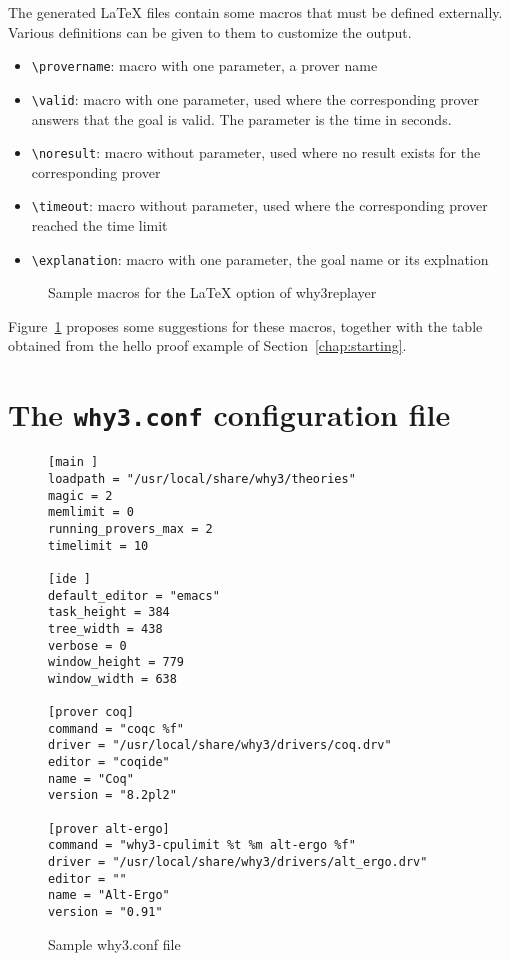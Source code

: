 The generated LaTeX files contain some macros that must be defined
externally.  Various definitions can be given to them to customize the
output. 
\begin{itemize}
\item \verb|\provername|: macro with one parameter, a prover name
\item \verb|\valid|: macro with one parameter, used where the corresponding prover answers that the goal is valid. The parameter is the time in seconds.
\item \verb|\noresult|: macro without parameter, used where no result
  exists for the corresponding prover
\item \verb|\timeout|: macro without parameter, used where the corresponding prover reached the time limit
\item \verb|\explanation|: macro with one parameter, the goal name or its explnation
\end{itemize}

\begin{figure}[t]
  \begin{center}
    
  \end{center}
  
  \caption{Sample macros for the LaTeX option of why3replayer}
\label{fig:replayer}
\end{figure}

Figure~\ref{fig:replayer} proposes some suggestions for these macros, together
with the table obtained from the hello proof example of Section~\ref{chap:starting}.




\section{The \texttt{why3.conf} configuration file}
\label{sec:whyconffile}


\begin{figure}[t]
\begin{verbatim}
[main ]
loadpath = "/usr/local/share/why3/theories"
magic = 2
memlimit = 0
running_provers_max = 2
timelimit = 10

[ide ]
default_editor = "emacs"
task_height = 384
tree_width = 438
verbose = 0
window_height = 779
window_width = 638

[prover coq]
command = "coqc %f"
driver = "/usr/local/share/why3/drivers/coq.drv"
editor = "coqide"
name = "Coq"
version = "8.2pl2"

[prover alt-ergo]
command = "why3-cpulimit %t %m alt-ergo %f"
driver = "/usr/local/share/why3/drivers/alt_ergo.drv"
editor = ""
name = "Alt-Ergo"
version = "0.91"
\end{verbatim}
  \caption{Sample why3.conf file}
\label{fig:why3conf}
\end{figure}



